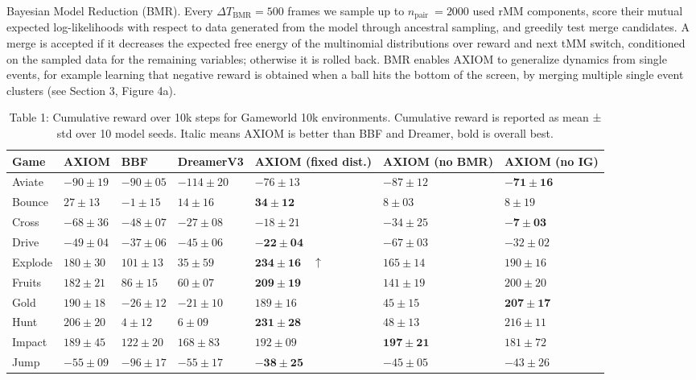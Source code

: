 \documentclass[10pt]{article}
\begin{document}
Bayesian Model Reduction (BMR). Every $\Delta T_{\mathrm{BMR}}=500$ frames we sample up to $n_{\text {pair }}=2000$ used rMM components, score their mutual expected log-likelihoods with respect to data generated from the model through ancestral sampling, and greedily test merge candidates. A merge is accepted if it decreases the expected free energy of the multinomial distributions over reward and next tMM switch, conditioned on the sampled data for the remaining variables; otherwise it is rolled back. BMR enables AXIOM to generalize dynamics from single events, for example learning that negative reward is obtained when a ball hits the bottom of the screen, by merging multiple single event clusters (see Section 3, Figure 4a).

\begin{table}[h]
\begin{center}
\captionsetup{labelformat=empty}
\caption{Table 1: Cumulative reward over 10k steps for Gameworld 10k environments. Cumulative reward is reported as mean ± std over 10 model seeds. Italic means AXIOM is better than BBF and Dreamer, bold is overall best.}
\begin{tabular}{|l|l|l|l|l|l|l|}
\hline
Game & AXIOM & BBF & DreamerV3 & AXIOM (fixed dist.) & AXIOM (no BMR) & AXIOM (no IG) \\
\hline
Aviate & $-90 \pm 19$ & $-90 \pm 05$ & $-114 \pm 20$ & $-76 \pm 13$ & $-87 \pm 12$ & $-\mathbf{7 1} \pm \mathbf{1 6}$ \\
\hline
Bounce & $27 \pm 13$ & $-1 \pm 15$ & $14 \pm 16$ & $\mathbf{3 4} \pm \mathbf{1 2}$ & $8 \pm 03$ & $8 \pm 19$ \\
\hline
Cross & $-68 \pm 36$ & $-48 \pm 07$ & $-27 \pm 08$ & $-18 \pm 21$ & $-34 \pm 25$ & $\mathbf{- 7} \pm \mathbf{0 3}$ \\
\hline
Drive & $-49 \pm 04$ & $-37 \pm 06$ & $-45 \pm 06$ & $-\mathbf{2 2} \pm \mathbf{0 4}$ & $-67 \pm 03$ & $-32 \pm 02$ \\
\hline
Explode & $180 \pm 30$ & $101 \pm 13$ & $35 \pm 59$ & $\mathbf{2 3 4} \pm \mathbf{1 6} \quad \uparrow$ & $165 \pm 14$ & $190 \pm 16$ \\
\hline
Fruits & $182 \pm 21$ & $86 \pm 15$ & $60 \pm 07$ & $\mathbf{2 0 9} \pm \mathbf{1 9}$ & $141 \pm 19$ & $200 \pm 20$ \\
\hline
Gold & $190 \pm 18$ & $-26 \pm 12$ & $-21 \pm 10$ & $189 \pm 16$ & $45 \pm 15$ & $\mathbf{2 0 7} \pm \mathbf{1 7}$ \\
\hline
Hunt & $206 \pm 20$ & $4 \pm 12$ & $6 \pm 09$ & $\mathbf{2 3 1} \pm \mathbf{2 8}$ & $48 \pm 13$ & $216 \pm 11$ \\
\hline
Impact & $189 \pm 45$ & $122 \pm 20$ & $168 \pm 83$ & $192 \pm 09$ & $\mathbf{1 9 7} \pm \mathbf{2 1}$ & $181 \pm 72$ \\
\hline
Jump & $-55 \pm 09$ & $-96 \pm 17$ & $-55 \pm 17$ & $-\mathbf{3 8} \pm \mathbf{2 5}$ & $-45 \pm 05$ & $-43 \pm 26$ \\
\hline
\end{tabular}
\end{center}
\end{table}
\end{document}
